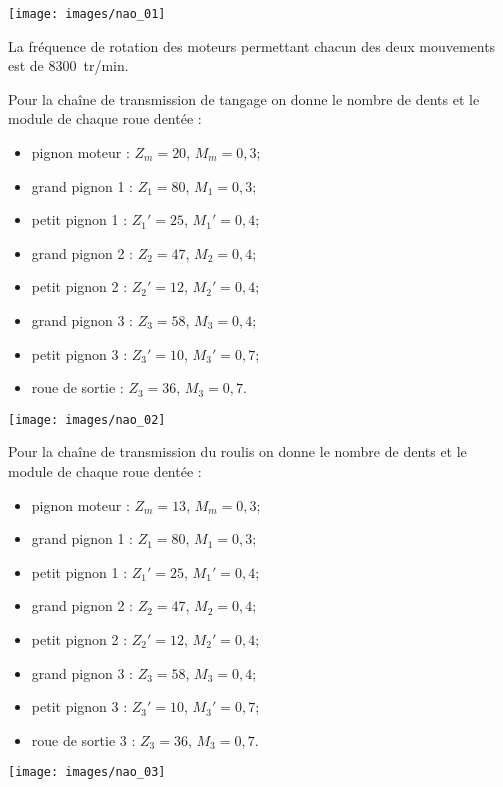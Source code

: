 \documentclass[10pt,fleqn]{article} %
\begin{document}
\begin{multicols}{2}
\begin{multicols}{2}
\begin{center}
\texttt{[image: images/nao\_01]}
\end{center}

La fréquence de rotation des moteurs permettant chacun des deux mouvements est de \SI{8300}{tr/min}.

Pour la chaîne de transmission de tangage on donne  le nombre de dents et le module de chaque roue dentée : 
\begin{itemize}
\item pignon moteur : $Z_m=20$, $M_m=0,3$;
\item grand pignon 1 : $Z_1 = 80$, $M_1=0,3$;
\item petit pignon 1 : $Z_1' = 25$, $M_1'=0,4$;
\item grand pignon 2 : $Z_2 = 47$, $M_2=0,4$;
\item petit pignon 2 : $Z_2' = 12$, $M_2'=0,4$;
\item grand pignon 3 : $Z_3 = 58$, $M_3=0,4$;
\item petit pignon 3 : $Z_3' = 10$, $M_3'=0,7$;
\item roue de sortie : $Z_3 = 36$, $M_3=0,7$.
\end{itemize}

\begin{center}
\texttt{[image: images/nao\_02]}
\end{center}

Pour la chaîne de transmission du roulis on donne le nombre de dents et le module de chaque roue dentée : 
\begin{itemize}
\item pignon moteur : $Z_m=13$, $M_m=0,3$;
\item grand pignon 1 : $Z_1 = 80$, $M_1=0,3$;
\item petit pignon 1 : $Z_1' = 25$, $M_1'=0,4$;
\item grand pignon 2 : $Z_2 = 47$, $M_2=0,4$;
\item petit pignon 2 : $Z_2' = 12$, $M_2'=0,4$;
\item grand pignon 3 : $Z_3 = 58$, $M_3=0,4$;
\item petit pignon 3 : $Z_3' = 10$, $M_3'=0,7$;
\item roue de sortie 3 : $Z_3 = 36$, $M_3=0,7$.
\end{itemize}



\begin{center}
\texttt{[image: images/nao\_03]}
\end{center}
\fi




\end{multicols}
\end{multicols}
\end{document}
